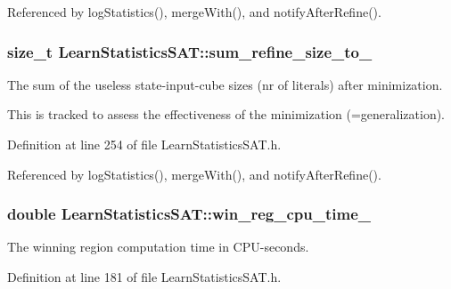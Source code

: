 Referenced by log\-Statistics(), merge\-With(), and notify\-After\-Refine().

\hypertarget{classLearnStatisticsSAT_ab64cce193c819cdd5c3a6838d99eb0a7}{
\subsubsection[{sum\-\_\-refine\-\_\-size\-\_\-to\-\_\-}]{\setlength{\rightskip}{0pt plus 5cm}size\-\_\-t Learn\-Statistics\-S\-A\-T\-::sum\-\_\-refine\-\_\-size\-\_\-to\-\_\-\hspace{0.3cm}{\ttfamily [protected]}}}\label{classLearnStatisticsSAT_ab64cce193c819cdd5c3a6838d99eb0a7}


The sum of the useless state-\/input-\/cube sizes (nr of literals) after minimization. 

This is tracked to assess the effectiveness of the minimization (=generalization). 

Definition at line 254 of file Learn\-Statistics\-S\-A\-T.\-h.



Referenced by log\-Statistics(), merge\-With(), and notify\-After\-Refine().

\hypertarget{classLearnStatisticsSAT_af9823be5155743223790ae01b91b7ca8}{
\subsubsection[{win\-\_\-reg\-\_\-cpu\-\_\-time\-\_\-}]{\setlength{\rightskip}{0pt plus 5cm}double Learn\-Statistics\-S\-A\-T\-::win\-\_\-reg\-\_\-cpu\-\_\-time\-\_\-\hspace{0.3cm}{\ttfamily [protected]}}}\label{classLearnStatisticsSAT_af9823be5155743223790ae01b91b7ca8}


The winning region computation time in C\-P\-U-\/seconds. 



Definition at line 181 of file Learn\-Statistics\-S\-A\-T.\-h.



